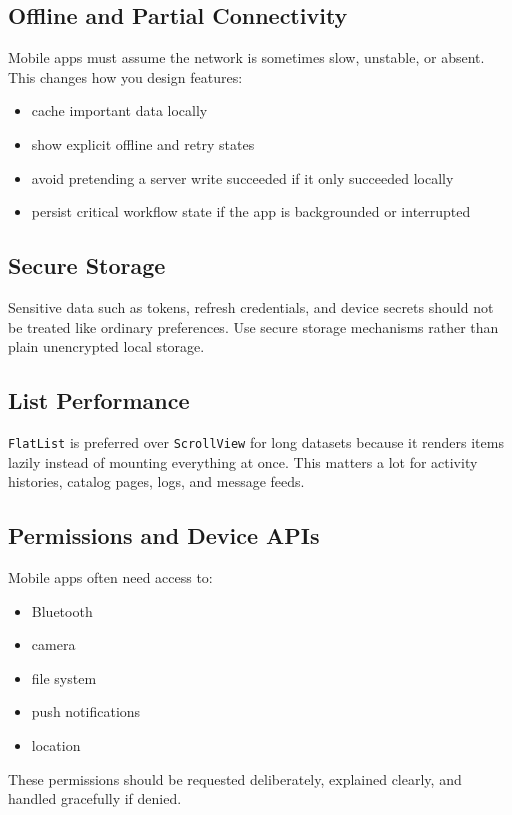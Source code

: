 \documentclass[12pt, a4paper, oneside]{book}
\begin{document}
\subsection{Offline and Partial Connectivity}
Mobile apps must assume the network is sometimes slow, unstable, or absent. This changes how you design features:
\begin{itemize}[leftmargin=2em]
    \item cache important data locally
    \item show explicit offline and retry states
    \item avoid pretending a server write succeeded if it only succeeded locally
    \item persist critical workflow state if the app is backgrounded or interrupted
\end{itemize}

\subsection{Secure Storage}
Sensitive data such as tokens, refresh credentials, and device secrets should not be treated like ordinary preferences. Use secure storage mechanisms rather than plain unencrypted local storage.

\subsection{List Performance}
\texttt{FlatList} is preferred over \texttt{ScrollView} for long datasets because it renders items lazily instead of mounting everything at once. This matters a lot for activity histories, catalog pages, logs, and message feeds.

\subsection{Permissions and Device APIs}
Mobile apps often need access to:
\begin{itemize}[leftmargin=2em]
    \item Bluetooth
    \item camera
    \item file system
    \item push notifications
    \item location
\end{itemize}

These permissions should be requested deliberately, explained clearly, and handled gracefully if denied.
\end{document}
